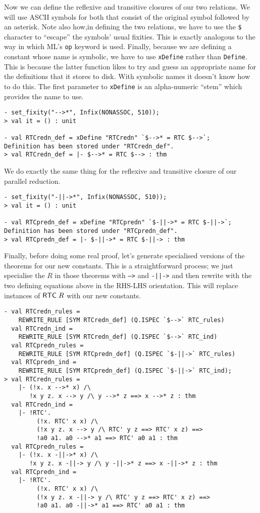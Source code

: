 \documentclass[12pt]{article}
\begin{document}
Now we can define the reflexive and transitive closures of our two
relations.  We will use ASCII symbols for both that consist of the
original symbol followed by an asterisk.  Note also how,in
defining the two relations, we have to use the \texttt{\$} character
to ``escape'' the symbols' usual fixities.  This is exactly analogous
to the way in which ML's \texttt{op} keyword is used.  Finally,
because we are defining a constant whose name is symbolic, we have to
use \texttt{xDefine} rather than \texttt{Define}.  This is because the
latter function likes to try and guess an appropriate name for the
definitions that it stores to disk.  With symbolic names it doesn't
know how to do this.  The first parameter to \texttt{xDefine} is an
alpha-numeric ``stem'' which provides the name to use.
\begin{session}\begin{verbatim}
- set_fixity("-->*", Infix(NONASSOC, 510));
> val it = () : unit

- val RTCredn_def = xDefine "RTCredn" `$-->* = RTC $-->`;
Definition has been stored under "RTCredn_def".
> val RTCredn_def = |- $-->* = RTC $--> : thm
\end{verbatim}\end{session}
We do exactly the same thing for the reflexive and transitive closure
of our parallel reduction.
\begin{session}\begin{verbatim}
- set_fixity("-||->*", Infix(NONASSOC, 510));
> val it = () : unit

- val RTCpredn_def = xDefine "RTCpredn" `$-||->* = RTC $-||->`;
Definition has been stored under "RTCpredn_def".
> val RTCpredn_def = |- $-||->* = RTC $-||-> : thm
\end{verbatim}\end{session}
Finally, before doing some real proof, let's generate specialised
versions of the  theorems for our new constants.  This is a
straightforward process; we just specialise the $R$ in those theorems
with \texttt{-->} and \texttt{-||->} and then rewrite with the two
defining equations above in the RHS-LHS orientation.  This will
replace instances of ${\sf RTC}\;R$ with our new constants.
\begin{session}\begin{verbatim}
- val RTCredn_rules =
    REWRITE_RULE [SYM RTCredn_def] (Q.ISPEC `$-->` RTC_rules)
  val RTCredn_ind =
    REWRITE_RULE [SYM RTCredn_def] (Q.ISPEC `$-->` RTC_ind)
  val RTCpredn_rules =
    REWRITE_RULE [SYM RTCpredn_def] (Q.ISPEC `$-||->` RTC_rules)
  val RTCpredn_ind =
    REWRITE_RULE [SYM RTCpredn_def] (Q.ISPEC `$-||->` RTC_ind);
> val RTCredn_rules =
    |- (!x. x -->* x) /\
       !x y z. x --> y /\ y -->* z ==> x -->* z : thm
  val RTCredn_ind =
    |- !RTC'.
         (!x. RTC' x x) /\
         (!x y z. x --> y /\ RTC' y z ==> RTC' x z) ==>
         !a0 a1. a0 -->* a1 ==> RTC' a0 a1 : thm
  val RTCpredn_rules =
    |- (!x. x -||->* x) /\
       !x y z. x -||-> y /\ y -||->* z ==> x -||->* z : thm
  val RTCpredn_ind =
    |- !RTC'.
         (!x. RTC' x x) /\
         (!x y z. x -||-> y /\ RTC' y z ==> RTC' x z) ==>
         !a0 a1. a0 -||->* a1 ==> RTC' a0 a1 : thm
\end{verbatim}\end{session}
\end{document}
